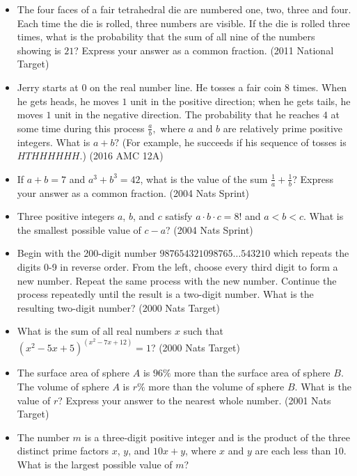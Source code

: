 \documentclass{article}
\begin{document}
\begin{itemize}
\begin{itemize}
\item The four faces of a fair tetrahedral die are numbered one, two, three and four. Each time the die is rolled, three numbers are visible. If the die is rolled three times, what is the probability that the sum of all nine of the numbers showing is $21$? Express your answer as a common fraction. (2011 National Target)

\item Jerry starts at $0$ on the real number line. He tosses a fair coin $8$ times. When he gets heads, he moves $1$ unit in the positive direction; when he gets tails, he moves $1$ unit in the negative direction. The probability that he reaches $4$ at some time during this process $\frac{a}{b},$ where $a$ and $b$ are relatively prime positive integers. What is $a + b?$ (For example, he succeeds if his sequence of tosses is $HTHHHHHH.$) (2016 AMC 12A)

\item If $a+b=7$ and $a^3+b^3=42$, what is the value of the sum $\frac{1}{a}+\frac{1}{b}$? Express your answer as a common fraction. (2004 Nats Sprint)

\item Three positive integers $a$, $b$, and $c$ satisfy $a\cdot b\cdot c=8!$ and $a<b<c$. What is the smallest possible value of $c-a$? (2004 Nats Sprint)

\item Begin with the 200-digit number $987654321098765\ldots 543210$ which repeats the digits 0-9 in reverse order. From the left, choose every third digit to form a new number. Repeat the same process with the new number. Continue the process repeatedly until the result is a two-digit number. What is the resulting two-digit number? (2000 Nats Target)

\item What is the sum of all real numbers $x$ such that $(x^2-5x+5)^{(x^2-7x+12)}=1$? (2000 Nats Target)

\item The surface area of sphere $A$ is $96\%$ more than the surface area of sphere $B$. The volume of sphere $A$ is $r\%$ more than the volume of sphere $B$. What is the value of $r$? Express your answer to the nearest whole number. (2001 Nats Target)

\item The number $m$ is a three-digit positive integer and is the product of the three distinct prime factors $x$, $y$, and $10x+y$, where $x$ and $y$ are each less than $10$. What is the largest possible value of $m$?


\end{itemize}
\end{itemize}
\end{document}

